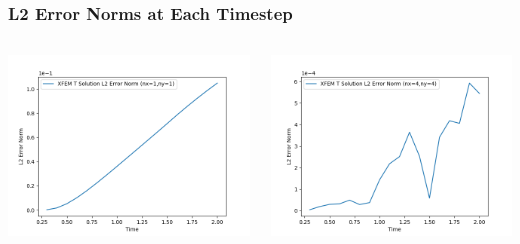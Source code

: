 \documentclass[]{beamer}
\begin{document}
\begin{frame}[t]\frametitle{L2 Error Norms at Each Timestep}
  	\begin{columns}
			\begin{center}
			\includegraphics[scale=0.4]{figures/2D_xy_homog1mat_nx1ny1_L2_Errs}
			\end{center}
			\begin{center}
			\includegraphics[scale=0.4]{figures/2D_xy_homog1mat_nx4ny4_L2_Errs}
			\end{center}
	\end{columns}
\end{frame}
\end{document}
